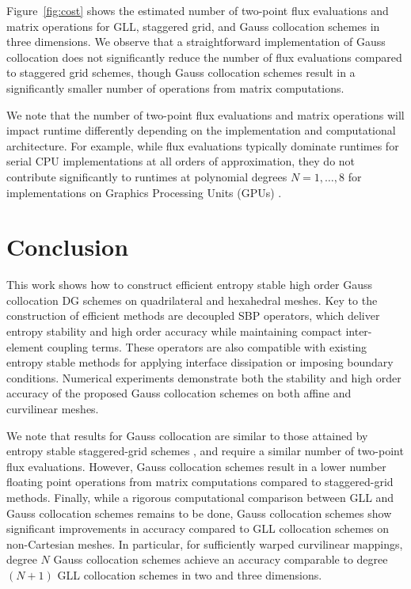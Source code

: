 \documentclass[onefignum,onetabnum,final]{siamart171218}
\begin{document}
Figure~\ref{fig:cost} shows the estimated number of two-point flux evaluations and matrix operations for GLL, staggered grid, and Gauss collocation schemes in three dimensions.  We observe that a straightforward implementation of Gauss collocation does not significantly reduce the number of flux evaluations compared to staggered grid schemes, though Gauss collocation schemes result in a  significantly smaller number of operations from matrix computations.  

We note that the number of two-point flux evaluations and matrix operations will impact runtime differently depending on the implementation and computational architecture.  For example, while flux evaluations typically dominate runtimes for serial CPU implementations at all orders of approximation, they do not contribute significantly to runtimes at polynomial degrees $N=1,\ldots, 8$ for implementations on Graphics Processing Units (GPUs) \cite{wintermeyer2018entropy}.  

\section{Conclusion}

This work shows how to construct efficient entropy stable high order Gauss collocation DG schemes on quadrilateral and hexahedral meshes.  Key to the construction of efficient methods are decoupled SBP operators, which deliver entropy stability and high order accuracy while maintaining compact inter-element coupling terms.  These operators are also compatible with existing entropy stable methods for applying interface dissipation \cite{winters2017uniquely} or imposing boundary conditions.  Numerical experiments demonstrate both the stability and high order accuracy of the proposed Gauss collocation schemes on both affine and curvilinear meshes.  

We note that results for Gauss collocation are similar to those attained by entropy stable staggered-grid schemes \cite{parsani2016entropy}, and require a similar number of two-point flux evaluations.  However, Gauss collocation schemes result in a lower number floating point operations from matrix computations compared to staggered-grid methods.  Finally, while a rigorous computational comparison between GLL and Gauss collocation schemes remains to be done, Gauss collocation schemes show significant improvements in accuracy compared to GLL collocation schemes on non-Cartesian meshes.  In particular, for sufficiently warped curvilinear mappings, degree $N$ Gauss collocation schemes achieve an accuracy comparable to degree $(N+1)$ GLL collocation schemes in two and three dimensions.  
\end{document}
